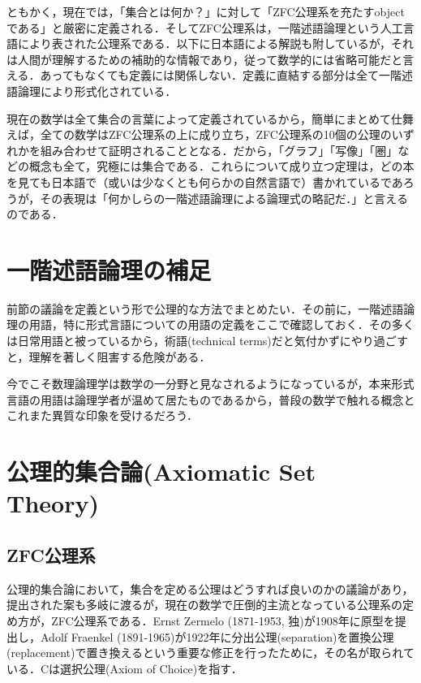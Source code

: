 \documentclass[uplatex, 12pt, a4paper, dvipdfmx]{jsreport}
\begin{document}
ともかく，現在では，「集合とは何か？」に対して「ZFC公理系を充たすobjectである」と厳密に定義される．そしてZFC公理系は，一階述語論理という人工言語により表された公理系である．以下に日本語による解説も附しているが，それは人間が理解するための補助的な情報であり，従って数学的には省略可能だと言える．あってもなくても定義には関係しない．定義に直結する部分は全て一階述語論理により形式化されている．\par
現在の数学は全て集合の言葉によって定義されているから，簡単にまとめて仕舞えば，全ての数学はZFC公理系の上に成り立ち，ZFC公理系の10個の公理のいずれかを組み合わせて証明されることとなる．だから，「グラフ」「写像」「圏」などの概念も全て，究極には集合である．これらについて成り立つ定理は，どの本を見ても日本語で（或いは少なくとも何らかの自然言語で）書かれているであろうが，その表現は「何かしらの一階述語論理による論理式の略記だ．」と言えるのである．

\section{一階述語論理の補足}

前節の議論を定義という形で公理的な方法でまとめたい．その前に，一階述語論理の用語，特に形式言語についての用語の定義をここで確認しておく．その多くは日常用語と被っているから，術語(technical terms)だと気付かずにやり過ごすと，理解を著しく阻害する危険がある．\par
今でこそ数理論理学は数学の一分野と見なされるようになっているが，本来形式言語の用語は論理学者が温めて居たものであるから，普段の数学で触れる概念とこれまた異質な印象を受けるだろう．

\section{公理的集合論(Axiomatic Set Theory)}

\subsection{ZFC公理系}
公理的集合論において，集合を定める公理はどうすれば良いのかの議論があり，提出された案も多岐に渡るが，現在の数学で圧倒的主流となっている公理系の定め方が，ZFC公理系である．Ernst Zermelo (1871-1953, 独)が1908年に原型を提出し，Adolf Fraenkel (1891-1965)が1922年に分出公理(separation)を置換公理(replacement)で置き換えるという重要な修正を行ったために，その名が取られている．Cは選択公理(Axiom of Choice)を指す．
\end{document}
